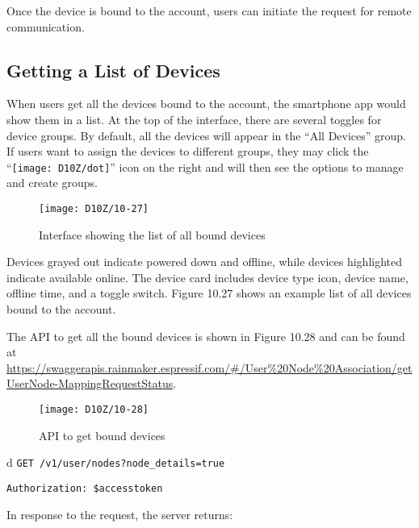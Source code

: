 \documentclass[a4paper,12pt]{book}
\begin{document}
Once the device is bound to the account, users can initiate the request for remote communication.

\subsection{Getting a List of Devices}
When users get all the devices bound to the account, the smartphone app would show them in a list. At the top of the interface, there are several toggles for device groups. By default, all the devices will appear in the “All Devices” group. If users want to assign the devices to different groups, they may click the “\texttt{[image: D10Z/dot]}” icon on the right and will then see the options to manage and create groups.

\begin{figure}[ht]
    \centering
    \texttt{[image: D10Z/10-27]}
    \caption{Interface showing the list of all bound devices}
\end{figure}

Devices grayed out indicate powered down and offline, while devices highlighted indicate available online. The device card includes device type icon, device name, offline time, and a toggle switch. Figure 10.27 shows an example list of all devices bound to the account.

The API to get all the bound devices is shown in Figure 10.28 and can be found at \href{https://swaggerapis.rainmaker.espressif.com/#/User%20Node%20Association/getUserNodeMappingRequestStatus}{https://\newline swaggerapis.rainmaker.espressif.com/\#/User\%20Node\%20Association/getUserNode-\newline MappingRequestStatus}.

\begin{figure}[ht]
    \centering
    \texttt{[image: D10Z/10-28]}
    \caption{API to get bound devices}
\end{figure}

\begin{codebloc}
\begin{tabular}{d}
\verb|GET /v1/user/nodes?node_details=true|

\verb|Authorization: $accesstoken|
\end{tabular}
\end{codebloc}

In response to the request, the server returns:
\end{document}
